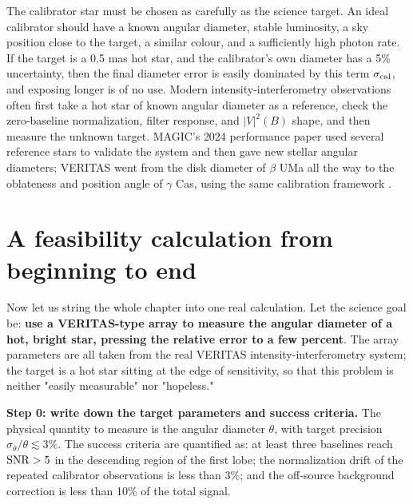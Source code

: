 The calibrator star must be chosen as carefully as the science target. An ideal calibrator should have a known angular diameter, stable luminosity, a sky position close to the target, a similar colour, and a sufficiently high photon rate. If the target is a 0.5 mas hot star, and the calibrator's own diameter has a 5\% uncertainty, then the final diameter error is easily dominated by this term $\sigma_{\rm cal}$, and exposing longer is of no use. Modern intensity-interferometry observations often first take a hot star of known angular diameter as a reference, check the zero-baseline normalization, filter response, and $|V|^2(B)$ shape, and then measure the unknown target. MAGIC's 2024 performance paper used several reference stars to validate the system and then gave new stellar angular diameters; VERITAS went from the disk diameter of $\beta$ UMa all the way to the oblateness and position angle of $\gamma$ Cas, using the same calibration framework \citep{2024MNRAS.529.4387A,2024ApJ...966...28A,2025ApJ...995..191A}.

\section{A feasibility calculation from beginning to end}
\label{sec:e15-worked}

Now let us string the whole chapter into one real calculation. Let the science goal be: \textbf{use a VERITAS-type array to measure the angular diameter of a hot, bright star, pressing the relative error to a few percent}. The array parameters are all taken from the real VERITAS intensity-interferometry system; the target is a hot star sitting at the edge of sensitivity, so that this problem is neither "easily measurable" nor "hopeless."

\textbf{Step 0: write down the target parameters and success criteria.} The physical quantity to measure is the angular diameter $\theta$, with target precision $\sigma_\theta/\theta\lesssim3\%$. The success criteria are quantified as: at least three baselines reach ${\rm SNR}>5$ in the descending region of the first lobe; the normalization drift of the repeated calibrator observations is less than 3\%; and the off-source background correction is less than 10\% of the total signal.

